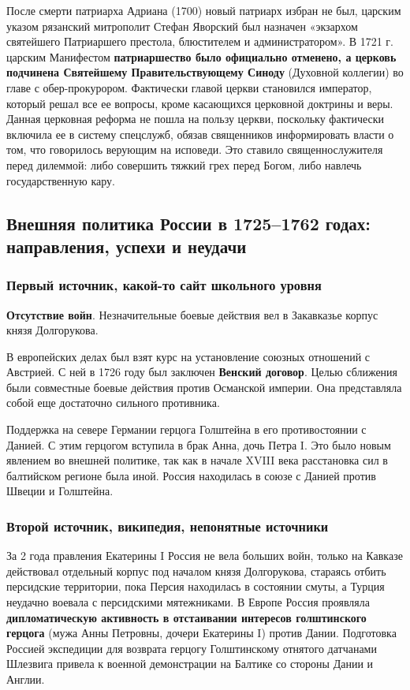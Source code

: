 \documentclass{article}
\begin{document}
После смерти патриарха Адриана (1700) новый патриарх избран не был, царским указом рязанский митрополит Стефан Яворский был назначен «экзархом святейшего Патриаршего престола, блюстителем и администратором». В 1721 г. царским Манифестом \textbf{патриаршество было официально отменено, а церковь подчинена Святейшему Правительствующему Синоду} (Духовной коллегии) во главе с обер-прокурором. Фактически главой церкви становился император, который решал все ее вопросы, кроме касающихся церковной доктрины и веры. Данная церковная реформа не пошла на пользу церкви, поскольку фактически включила ее в систему спецслужб, обязав священников информировать власти о том, что говорилось верующим на исповеди. Это ставило священнослужителя перед дилеммой: либо совершить тяжкий грех перед Богом, либо навлечь государственную кару.

\pagebreak
\subsection{Внешняя политика России в 1725–1762 годах: направления, успехи и неудачи}

\subsubsection{Первый источник, какой-то сайт школьного уровня}

\textbf{Отсутствие войн}. Незначительные боевые действия вел в Закавказье корпус князя Долгорукова.

В европейских делах был взят курс на установление союзных отношений с Австрией. С ней в 1726 году был заключен \textbf{Венский договор}. Целью сближения были совместные боевые действия против Османской империи. Она представляла собой еще достаточно сильного противника.

Поддержка на севере Германии герцога Голштейна в его противостоянии с Данией. С этим герцогом вступила в брак Анна, дочь Петра I. Это было новым явлением во внешней политике, так как в начале XVIII века расстановка сил в балтийском регионе была иной. Россия находилась в союзе с Данией против Швеции и Голштейна.

\subsubsection{Второй источник, википедия, непонятные источники}

За 2 года правления Екатерины I Россия не вела больших войн, только на Кавказе действовал отдельный корпус под началом князя Долгорукова, стараясь отбить персидские территории, пока Персия находилась в состоянии смуты, а Турция неудачно воевала с персидскими мятежниками. В Европе Россия проявляла \textbf{дипломатическую активность в отстаивании интересов голштинского герцога} (мужа Анны Петровны, дочери Екатерины I) против Дании. Подготовка Россией экспедиции для возврата герцогу Голштинскому отнятого датчанами Шлезвига привела к военной демонстрации на Балтике со стороны Дании и Англии. 
\end{document}
